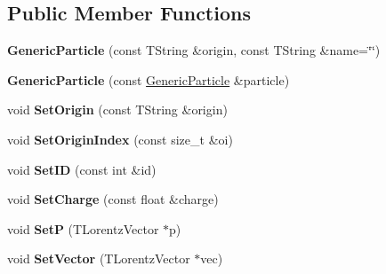 \subsection*{Public Member Functions}
\begin{DoxyCompactItemize}
\item 
\hypertarget{class_h_a_l_1_1_generic_particle_a3efe0e487f7fe9e779321363eb9dde35}{{\bfseries Generic\+Particle} (const T\+String \&origin, const T\+String \&name=\char`\"{}\char`\"{})}\label{class_h_a_l_1_1_generic_particle_a3efe0e487f7fe9e779321363eb9dde35}

\item 
\hypertarget{class_h_a_l_1_1_generic_particle_a1e9e01f96e31e980b2c31af42bb1c514}{{\bfseries Generic\+Particle} (const \hyperlink{class_h_a_l_1_1_generic_particle}{Generic\+Particle} \&particle)}\label{class_h_a_l_1_1_generic_particle_a1e9e01f96e31e980b2c31af42bb1c514}

\item 
\hypertarget{class_h_a_l_1_1_generic_particle_a91b82bc5204850ab0d40163ed103ee12}{void {\bfseries Set\+Origin} (const T\+String \&origin)}\label{class_h_a_l_1_1_generic_particle_a91b82bc5204850ab0d40163ed103ee12}

\item 
\hypertarget{class_h_a_l_1_1_generic_particle_a81d7aa1fd86d8f1d7e78286f32840e90}{void {\bfseries Set\+Origin\+Index} (const size\+\_\+t \&oi)}\label{class_h_a_l_1_1_generic_particle_a81d7aa1fd86d8f1d7e78286f32840e90}

\item 
\hypertarget{class_h_a_l_1_1_generic_particle_aa125325fe47360c75036732b90ca2c5b}{void {\bfseries Set\+I\+D} (const int \&id)}\label{class_h_a_l_1_1_generic_particle_aa125325fe47360c75036732b90ca2c5b}

\item 
\hypertarget{class_h_a_l_1_1_generic_particle_a06e76eefefa12e67947c8e3cfd0ab401}{void {\bfseries Set\+Charge} (const float \&charge)}\label{class_h_a_l_1_1_generic_particle_a06e76eefefa12e67947c8e3cfd0ab401}

\item 
\hypertarget{class_h_a_l_1_1_generic_particle_a985b92b525a1b6c2199b3c797dae153d}{void {\bfseries Set\+P} (T\+Lorentz\+Vector $\ast$p)}\label{class_h_a_l_1_1_generic_particle_a985b92b525a1b6c2199b3c797dae153d}

\item 
\hypertarget{class_h_a_l_1_1_generic_particle_a29a1b6d060a5bd6d4a2d5b638629016e}{void {\bfseries Set\+Vector} (T\+Lorentz\+Vector $\ast$vec)}\label{class_h_a_l_1_1_generic_particle_a29a1b6d060a5bd6d4a2d5b638629016e}


\end{DoxyCompactItemize}
